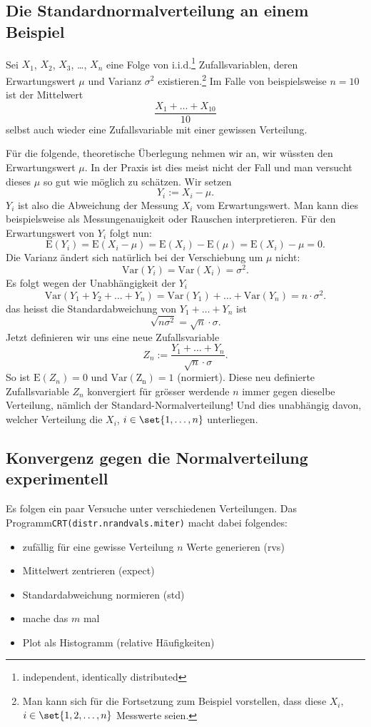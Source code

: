 \documentclass[%
11pt,%
twoside,%
titlepage,%
german,%
headsepline%
]{scrartcl}
\newcounter{theo}[section]\setcounter{theo}{0}
\newcommand{\definition}[1]{\colorbox{emerald}{#1}}
\begin{document}
\subsection{Die Standardnormalverteilung an einem Beispiel}

Sei $X_1$, $X_2$, $X_3$, \dots , $X_n$ eine Folge von i.i.d.\footnote{independent, identically distributed} Zufallsvariablen, deren Erwartungswert $\mu$ und Varianz $\sigma^2$ existieren.\footnote{Man kann sich für die Fortsetzung zum Beispiel vorstellen, dass diese $X_i$, $i\in\set{1,2,\dots,n}$ Messwerte seien.} Im Falle von beispielsweise $n=10$ ist der Mittelwert
$$\frac{X_1+\dots+X_{10}}{10}$$
selbst auch wieder eine Zufallsvariable mit einer gewissen Verteilung.

Für die folgende, theoretische Überlegung nehmen wir an, wir wüssten den Erwartungswert $\mu$. In der Praxis ist dies meist nicht der Fall und man versucht dieses $\mu$ so gut wie möglich zu schätzen. Wir setzen
$$Y_i:=X_i-\mu.$$
$Y_i$ ist also die Abweichung der Messung $X_i$ vom Erwartungswert. Man kann dies beispielsweise als Messungenauigkeit oder Rauschen interpretieren. Für den Erwartungswert von $Y_i$ folgt nun:
$$\mathrm{E}(Y_i)=\mathrm{E}(X_i-\mu)=\mathrm{E}(X_i)-\mathrm{E}(\mu)=\mathrm{E}(X_i)-\mu=0.$$
Die Varianz ändert sich natürlich bei der Verschiebung um $\mu$ nicht:
$$\mathrm{Var}(Y_i)=\mathrm{Var}(X_i)=\sigma^2.$$
Es folgt wegen der Unabhängigkeit der $Y_i$
$$\mathrm{Var}(Y_1+Y_2+\dots+Y_n)=\mathrm{Var}(Y_1)+\dots+\mathrm{Var}(Y_n)=n\cdot\sigma^2.$$
das heisst die Standardabweichung von $Y_1+\dots+Y_n$ ist
$$\sqrt{n\sigma^2}=\sqrt{n}\cdot\sigma.$$
Jetzt definieren wir uns eine neue Zufallsvariable
$$Z_n:=\frac{Y_1+\dots+Y_n}{\sqrt{n}\cdot\sigma}.$$
So ist $\mathrm{E}(Z_n)=0$ und $\mathrm{Var(Z_n)}=1$ (normiert). Diese neu definierte Zufallsvariable $Z_n$ konvergiert für grösser werdende $n$ immer gegen dieselbe Verteilung, nämlich der \definition{Standard-Normalverteilung}! Und dies unabhängig davon, welcher Verteilung die $X_i$, $i\in\set{1,\dots,n}$ unterliegen.

\subsection{Konvergenz gegen die Normalverteilung experimentell}

Es folgen ein paar Versuche unter verschiedenen Verteilungen. Das Programm\linebreak \texttt{CRT(distr.nrandvals.miter)} macht dabei folgendes:
\begin{itemize}
    \item zufällig für eine gewisse Verteilung $n$ Werte generieren (rvs)
    \item Mittelwert zentrieren (expect)
    \item Standardabweichung normieren (std)
    \item mache das $m$ mal
    \item Plot als Histogramm (relative Häufigkeiten)
\end{itemize}
\end{document}
